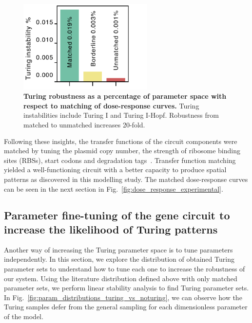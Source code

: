 \begin{figure}[H]
    \centering
    \includegraphics[width=0.6\textwidth]{chapters/Chapter 2/balancing_robustness}
    \caption{\textbf{Turing robustness as a percentage of parameter space with respect to matching of dose-response curves.} Turing instabilities include Turing I and Turing I-Hopf. Robustness from matched to unmatched increases 20-fold.}
    \label{fig:balancing_robustness}
\end{figure}

Following these insights, the transfer functions of the circuit components were matched by tuning the plasmid copy number,
the strength of ribosome binding sites (RBSs),
start codons and degradation tags~\parencite{Andersen1998, Wang2011,Hecht2017}.
Transfer function matching yielded a well-functioning circuit with a better capacity to produce spatial patterns
as discovered in this modelling study.
The matched dose-response curves can be seen in the next section in Fig.~\ref{fig:dose_response_experimental}.


\subsection{Parameter fine-tuning of the gene circuit to increase the likelihood of Turing patterns}
Another way of increasing the Turing parameter space is to tune parameters independently.
In this section, we explore the distribution of obtained Turing parameter sets
to understand how to tune each one to increase the robustness of our system.
Using the literature distribution defined above with only matched
parameter sets, we perform linear stability analysis to find Turing parameter sets.
In Fig.~\ref{fig:param_distributions_turing_vs_noturing},
we can observe how the Turing samples defer from the general sampling for each dimensionless parameter of the model.

